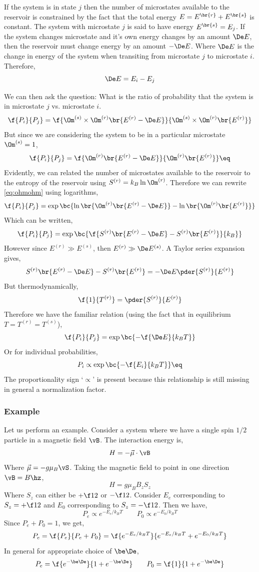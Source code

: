 \documentclass{article}
\begin{document}
If the system is in state $j$ then the number of microstates available to the reservoir is constrained by the fact that the total energy $E = E^{\br{r}} + E^{\br{s}}$ is constant. The system with microstate $j$ is said to have energy $E^{\br{s}} = E_j$. If the system changes microstate and it's own energy changes by an amount $\De E$, then the reservoir must change energy by an amount $-\De E$. Where $\De E$ is the change in energy of the system when transiting from microstate $j$ to microstate $i$. Therefore,
\[ \De E = E_i - E_j \]

We can then ask the question: What is the ratio of probability that the system is in microstate $j$ vs. microstate $i$.
\[ \f{P_i}{P_j} = \f{\Om^{(s)} \times \Om^{(r)}\br{E^{(r)} - \De E}}{\Om^{(s)} \times \Om^{(r)}\br{E^{(r)}}} \]
But since we are considering the system to be in a particular microstate $\Om^{(s)} = 1$,
\[ \f{P_i}{P_j} = \f{\Om^{(r)}\br{E^{(r)} - \De E}}{\Om^{(r)}\br{E^{(r)}}} \eq \label{eq:ohmohm}\]
Evidently, we can related the number of microstates available to the reservoir to the entropy of the reservoir using $S^{(r)} = k_B \ln \Om^{(r)}$. Therefore we can rewrite \eqref{eq:ohmohm} using logarithms,
\[ \f{P_i}{P_j} = \exp\bc{\ln \br{\Om^{(r)}\br{E^{(r)} - \De E}} - \ln \br{\Om^{(r)}\br{E^{(r)}}}} \]
Which can be written,
\[ \f{P_i}{P_j} = \exp\bc{\f{S^{(r)}\br{E^{(r)} - \De E} - S^{(r)}\br{E^{(r)}}}{k_B}} \]
However since $E^{(r)} \gg E^{(s)}$, then $E^{(r)} \gg \De E^{(s)}$. A Taylor series expansion gives,
\[ S^{(r)}\br{E^{(r)} - \De E} - S^{(r)}\br{E^{(r)}} = - \De E \pder{S^{(r)}}{E^{(r)}} \]
But thermodynamically,
\[ \f{1}{T^{(r)}} = \pder{S^{(r)}}{E^{(r)}}\]
Therefore we have the familiar relation (using the fact that in equilibrium $T = T^{(r)} = T^{(s)}$),
\[ \f{P_i}{P_j} = \exp\bc{-\f{\De E}{k_B T}} \]
Or for individual probabilities,
\[ P_i \propto \exp\bc{-\f{E_i}{k_B T}} \eq \label{eq:eoverkbt}\]
The proportionality sign `$\propto$' is present because this relationship is still missing in general a normalization factor.
\subsubsection{Example}
Let us perform an example. Consider a system where we have a single spin $1/2$ particle in a magnetic field $\vB$. The interaction energy is,
\[ H = - \vec{\mu} \cdot \vB \]
Where $\vec{\mu}= - g \mu_B \vS$. Taking the magnetic field to point in one direction $\vB = B \hz$,
\[ H = g \mu_B B_z S_z \]
Where $S_z$ can either be $+ \f12$ or $-\f12$. Consider $E_e$ corresponding to $S_z = +\f12$ and $E_0$ corresponding to $S_z = - \f12$. Then we have,
\[ P_e \propto e^{-E_e / k_B T} \qquad P_0 \propto e^{-E_0 / k_B T} \]
Since $P_e + P_0 = 1$, we get,
\[ P_e = \f{P_e}{P_e + P_0} = \f{e^{-E_e / k_B T}}{e^{-E_e / k_B T} + e^{-E_0 / k_B T}} \]
In general for appropriate choice of $\be \De$,
\[ P_e = \f{e^{-\be \De}}{1 + e^{-\be \De}} \qquad P_0 = \f{1}{1 + e^{-\be \De}} \]
\end{document}
